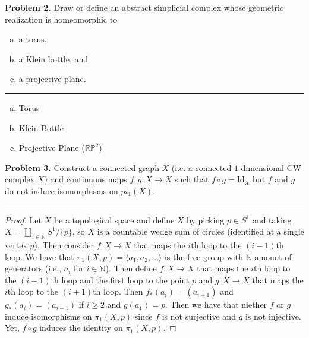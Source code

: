 \documentclass[leqno]{article}
\theoremstyle{nonumberplain}
\newtheorem{proof}{Proof}
\newcommand{\N}{\ensuremath{\mathbb{N}}}
\begin{document}
\pagebreak



\noindent\textbf{Problem 2.} Draw or define an abstract simplicial complex whose geometric realization is homeomorphic to
\begin{enumerate}[(a)]
\item a torus,
\item a Klein bottle, and
\item a projective plane.
\end{enumerate}


\noindent\rule[0.5ex]{\linewidth}{1pt}

\begin{enumerate}[(a)]
\item Torus \vspace*{5.5cm}
\item Klein Bottle \vspace*{5.5cm}
\item Projective Plane ($\mathbb{RP}^2$)
\end{enumerate}


\pagebreak




\noindent\textbf{Problem 3.} Construct a connected graph $X$ (i.e. a connected $1$-dimensional CW complex $X$) and continuous maps $f,g \colon X \to X$ such that $f\circ g = \mathrm{Id}_X$ but $f$ and $g$ do not induce isomorphisms on $pi_1(X)$.

\noindent\rule[0.5ex]{\linewidth}{1pt}

\begin{proof}
Let $X$ be a topological space and define $X$ by picking $p\in S^1$ and taking $X =\coprod_{i\in \mathbb{N}} S^1 / \{p\}$, so $X$ is a countable wedge sum of circles (identified at a single vertex $p$).  Then consider $f\colon X \to X$ that maps the $i$th loop to the $(i-1)$th loop.  We have that $\pi_1 (X,p) = \langle a_1, a_2, \dots \rangle$ is the free group with $\N$ amount of generators (i.e., $a_i$ for $i\in \N$). Then define $f\colon X \to X$ that maps the $i$th loop to the $(i-1)$th loop and the first loop to the point $p$ and $g\colon X \to X$ that maps the $i$th loop to the $(i+1)$th loop.  Then $f_*(a_i)=(a_{i+1})$ and $g_*(a_i)=(a_{i-1})$ if $i\geq 2$ and $g(a_1)=p$.  Then we have that niether $f$ or $g$ induce isomorphisms on $\pi_1 (X,p)$ since $f$ is not surjective and $g$ is not injective. Yet, $f\circ g$ induces the identity on $\pi_1 (X,p)$.
\end{proof}
\end{document}
